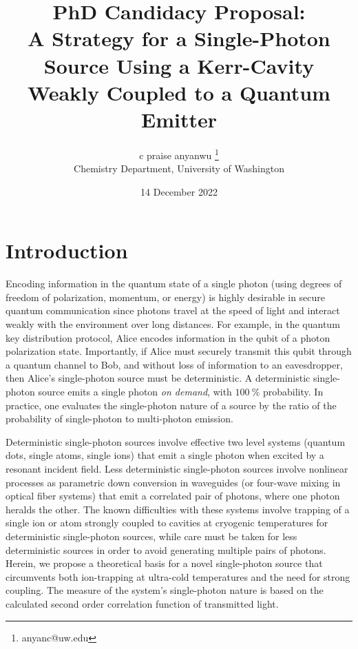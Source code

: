\documentclass[12pt]{article}
\begin{document}
\title{PhD Candidacy Proposal: \\
A Strategy for a Single-Photon Source Using a Kerr-Cavity Weakly
Coupled to a Quantum Emitter}
\author{c praise anyanwu 
    \thanks{anyanc@uw.edu} \\
    Chemistry Department, University of Washington
}
\date{14 December 2022}
\maketitle

\newpage
\section{Introduction}
Encoding information in the quantum state of a single photon (using degrees
of freedom of polarization, momentum, or energy) is highly desirable in 
secure quantum communication since photons travel at the speed of light and 
interact weakly with the environment over long distances.
\cite{gisin2002quantum, bennett2004quantum} For example, in the quantum key 
distribution protocol, Alice encodes information in the qubit of a photon 
polarization state. \cite{bennett1984proceedings, bennett1992quantum}
Importantly, if Alice must securely transmit this qubit through a quantum 
channel to Bob, and without loss of information to an eavesdropper, then 
Alice's single-photon source must be deterministic. A deterministic 
single-photon source emits a single photon \textit{on demand}, with $100 \: 
\%$ probability. In practice, one evaluates the single-photon nature of a 
source by the ratio of the probability of single-photon to multi-photon 
emission. \cite{lounis2005single, eisaman2011invited}

Deterministic single-photon sources involve effective two level systems 
(quantum dots, single atoms, single ions) \cite{ShieldsAndrewJ2007Sqls, 
strauf2007high, hennrich2004photon, wilk2007single, maurer2004single} 
that emit a single photon when excited by a resonant incident field. 
Less deterministic single-photon sources involve nonlinear processes as 
parametric down conversion in waveguides (or four-wave mixing in optical 
fiber systems) \cite{u2004efficient, sharping2001observation, 
goldschmidt2008spectrally} that emit a correlated pair of photons, where 
one photon heralds the other. The known difficulties with these systems 
involve trapping of a single ion or atom strongly coupled to cavities at 
cryogenic temperatures for deterministic single-photon sources, while 
care must be taken for less deterministic sources in order to avoid 
generating multiple pairs of photons. Herein, we propose a theoretical 
basis for a novel single-photon source that circumvents both 
ion-trapping at ultra-cold temperatures and the need for strong 
coupling. The measure of the system's single-photon nature is based on 
the calculated second order correlation function of transmitted light.
\end{document}
